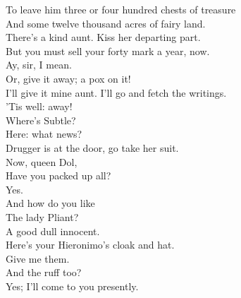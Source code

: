 \documentclass[a4paper,oneside,12pt]{memoir}
\begin{document}
\begin{drama*}
To leave him three or four hundred chests of treasure\\
And some twelve thousand acres of fairy land.\\
\subtlespeaks There's a kind aunt. Kiss her departing part.\\
But you must sell your forty mark a year, now.\\
\dapperspeaks Ay, sir, I mean.\\
\subtlespeaks {} Or, give it away; a pox on it!\\
\dapperspeaks I'll give it mine aunt. I'll go and fetch the writings.\\
\subtlespeaks 'Tis well: away!\\
\facespeaks {} Where's Subtle?\\
\subtlespeaks {} Here: what news?\\
\facespeaks Drugger is at the door, go take her suit.\\
 Now, queen Dol,\\
Have you packed up all?\\
\dolspeaks {} Yes.\\
\facespeaks {} And how do you like\\
The lady Pliant?\\
\dolspeaks {} A good dull innocent.\\
\subtlespeaks Here's your Hieronimo's cloak and hat.\\
\facespeaks {} Give me them.\\
\subtlespeaks And the ruff too?\\
\facespeaks {} Yes; I'll come to you presently.\\

\scene


\end{drama*}
\end{document}

